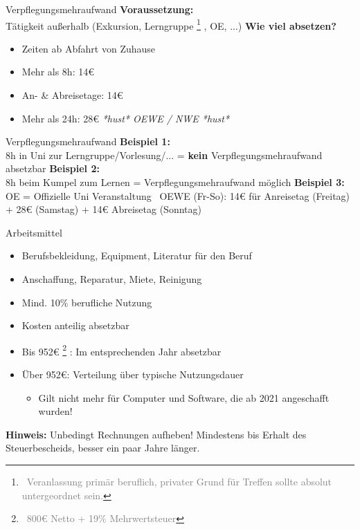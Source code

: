 \documentclass{beamer}
\let\oldfootnote\footnote
\renewcommand{\footnote}[1]
{%
	\oldfootnote
	{
		\tiny
		\textcolor{gray}{\ #1}
	}%
}
\begin{document}
			\begin{frame}{Verpflegungsmehraufwand}
				\textbf{Voraussetzung:}\\
				Tätigkeit außerhalb (Exkursion, Lerngruppe\footnote{Veranlassung primär beruflich, privater Grund für Treffen sollte absolut untergeordnet sein.}, OE, ...)\n
				\textbf{Wie viel absetzen?}
				\begin{itemize}
					\item Zeiten ab Abfahrt von Zuhause
					\item Mehr als 8h: 14€
					\item An- \& Abreisetage: 14€
					\item Mehr als 24h: 28€ {\tiny \textit{*hust* OEWE / NWE *hust*}}
				\end{itemize}
			\end{frame}
		
			\begin{frame}{Verpflegungsmehraufwand}
				\textbf{Beispiel 1:}\\
				8h in Uni zur Lerngruppe/Vorlesung/... = \textbf{kein} Verpflegungsmehraufwand absetzbar\n\pause
				\textbf{Beispiel 2:}\\
				8h beim Kumpel zum Lernen = Verpflegungsmehraufwand möglich\n\pause
				\textbf{Beispiel 3:}\\
				OE = Offizielle Uni Veranstaltung \textrightarrow\ OEWE (Fr-So): 14€ für Anreisetag (Freitag) + 28€ (Samstag) + 14€ Abreisetag (Sonntag)
			\end{frame}
		
			\begin{frame}{Arbeitsmittel}
				\begin{itemize}
					\item Berufsbekleidung, Equipment, Literatur für den Beruf
					\item Anschaffung, Reparatur, Miete, Reinigung
					\item Mind. 10\% berufliche Nutzung
					\item Kosten anteilig absetzbar
					\item Bis 952€\footnote{800€ Netto + 19\% Mehrwertsteuer}: Im entsprechenden Jahr absetzbar
					\item Über 952€: Verteilung über typische Nutzungsdauer
					\begin{itemize}
						\item Gilt nicht mehr für Computer und Software, die ab 2021 angeschafft wurden!
					\end{itemize}
				\end{itemize}\n\pause
			
				\textbf{Hinweis:} Unbedingt Rechnungen aufheben! Mindestens bis Erhalt des Steuerbescheids, besser ein paar Jahre länger.
			\end{frame}
		
\end{document}
